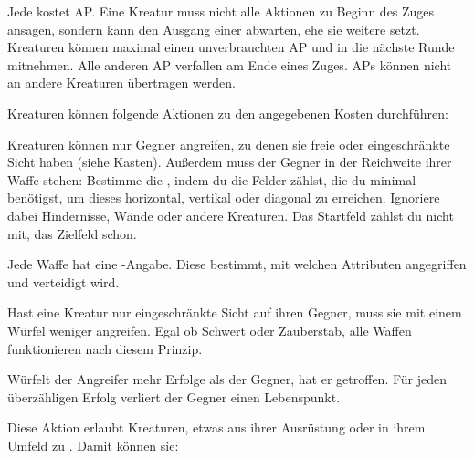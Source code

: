 {		Jede  kostet AP. Eine Kreatur muss nicht alle Aktionen zu Beginn des Zuges ansagen, sondern kann den Ausgang einer abwarten, ehe sie weitere setzt. Kreaturen können maximal einen unverbrauchten AP  und in die nächste Runde mitnehmen. Alle anderen AP verfallen am Ende eines Zuges. APs können nicht an andere Kreaturen übertragen werden.

		Kreaturen können folgende Aktionen zu den angegebenen Kosten durchführen:

		\medskip
		\medskip

			Kreaturen können nur Gegner angreifen, zu denen sie freie oder eingeschränkte Sicht haben (siehe Kasten). Außerdem muss der Gegner in der Reichweite ihrer Waffe stehen: Bestimme die , indem du die Felder zählst, die du minimal benötigst, um dieses horizontal, vertikal oder diagonal zu erreichen. Ignoriere dabei Hindernisse, Wände oder andere Kreaturen. Das Startfeld zählst du nicht mit, das Zielfeld schon.

			Jede Waffe hat eine -Angabe. Diese bestimmt, mit welchen Attributen angegriffen und verteidigt wird.


			\noindent
			Hast eine Kreatur nur eingeschränkte Sicht auf ihren Gegner, muss sie mit einem Würfel weniger angreifen. Egal ob Schwert oder Zauberstab, alle Waffen funktionieren nach diesem Prinzip.

			Würfelt der Angreifer mehr Erfolge als der Gegner, hat er getroffen. Für jeden überzähligen Erfolg verliert der Gegner einen Lebenspunkt.

			Diese Aktion erlaubt Kreaturen, etwas aus ihrer Ausrüstung oder in ihrem Umfeld zu . Damit können sie:

}
